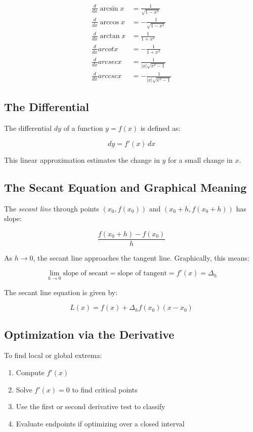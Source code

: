 \begin{align*}
    \frac{d}{dx} \arcsin x &= \frac{1}{\sqrt{1 - x^2}} \\
    \frac{d}{dx} \arccos x &= -\frac{1}{\sqrt{1 - x^2}} \\
    \frac{d}{dx} \arctan x &= \frac{1}{1 + x^2} \\
    \frac{d}{dx} arcot x &= -\frac{1}{1 + x^2} \\
    \frac{d}{dx} arcsec x &= \frac{1}{|x|\sqrt{x^2 - 1}} \\
    \frac{d}{dx} arccsc x &= -\frac{1}{|x|\sqrt{x^2 - 1}}
\end{align*}

\subsection{The Differential}

The differential \(dy\) of a function \(y = f(x)\) is defined as:

\[
    dy = f'(x) \, dx
\]

This linear approximation estimates the change in \(y\) for a small change in \(x\).

\subsection{The Secant Equation and Graphical Meaning}

The \emph{secant line} through points \((x_0, f(x_0))\) and \((x_0 + h, f(x_0 + h))\) has slope:

\[
    \frac{f(x_0 + h) - f(x_0)}{h}
\]

As \(h \to 0\), the secant line approaches the tangent line. Graphically, this means:

\[
    \lim_{h \to 0} \text{slope of secant} = \text{slope of tangent} = f'(x) = \Delta_h
\]

The secant line equation is given by:

\[
    L(x) = f(x) + \Delta_h f(x_0)(x - x_0)
\]

\subsection{Optimization via the Derivative}

To find local or global extrema:

\begin{enumerate}

    \item Compute \(f'(x)\)

    \item Solve \(f'(x) = 0\) to find critical points

    \item Use the first or second derivative test to classify

    \item Evaluate endpoints if optimizing over a closed interval

\end{enumerate}

